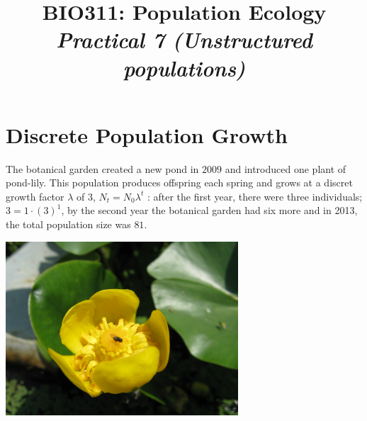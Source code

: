 \documentclass{article}\usepackage[]{graphicx}\usepackage[]{color}
\title{BIO311: Population Ecology\\ \textit{Practical 7 (Unstructured populations)}}
\begin{document}

\maketitle
\tableofcontents


\newpage


\section{Discrete Population Growth}
The botanical garden created a new pond in $2009$ and introduced one plant of pond-lily. This population produces offspring each spring and grows at a discret growth factor $\lambda$ of $3$, $N_t=N_0\lambda ^t$ : after the first year, there were three individuals; $3=1 \cdot (3)^1$, by the second year the botanical garden had six more and in 2013, the total population size was $81$.

\vspace{1.5ex}

\begin{center}
\includegraphics[width=0.65\textwidth]{Nuphar_pumilum2.jpg}
\end{center}
\vspace{1.5ex}
\end{document}
